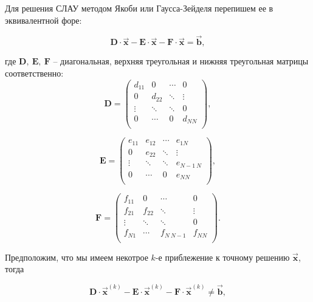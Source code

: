\documentclass[12pt,a4paper]{article}
\begin{document}
		Для решения СЛАУ методом Якоби или Гаусса-Зейделя перепишем ее в эквивалентной форе:

		\begin{equation}
			\mathbf{D} \cdot \vec{\mathbf{x}} - \mathbf{E} \cdot \vec{\mathbf{x}} - \mathbf{F} \cdot \vec{\mathbf{x}} = \vec{\mathbf{b}},
		\end{equation}

		где $\mathbf{D}, \: \mathbf{E}, \: \mathbf{F}$ -- диагональная, верхняя треугольная и нижняя треугольная матрицы соответственно:\\

		\begin{equation}
			\mathbf{D} =
			\begin{pmatrix}
				d_{11}	&0		&\cdots &0		\\
				0		&d_{22}	&\ddots	&\vdots	\\
				\vdots	&\ddots	&\ddots &0		\\
				0		&\cdots	&0		&d_{NN}	\\
			\end{pmatrix},
		\end{equation}

		\begin{equation}
			\mathbf{E} =
			\begin{pmatrix}
				e_{11}	&e_{12}	&\cdots &e_{1N}			\\
				0		&e_{22}	&\ddots	&\vdots			\\
				\vdots	&\ddots	&\ddots &e_{N-1 \: N}	\\
				0		&\cdots	&0		&e_{NN}			\\
			\end{pmatrix},
		\end{equation}

		\begin{equation}
			\mathbf{F} =
			\begin{pmatrix}
				f_{11}	&0		&\cdots			&0		\\
				f_{21}	&f_{22}	&\ddots			&\vdots	\\
				\vdots	&\ddots	&\ddots			&0		\\
				f_{N1}	&\cdots	&f_{N \: N-1}	&f_{NN}	\\
			\end{pmatrix}.
		\end{equation}

		Предположим, что мы имеем некотрое $k$-е приблежение к точному решению $\vec{\mathbf{x}}$, тогда

		\begin{equation}
			\mathbf{D} \cdot \vec{\mathbf{x}}^{(k)} - \mathbf{E} \cdot \vec{\mathbf{x}}^{(k)} - \mathbf{F} \cdot \vec{\mathbf{x}}^{(k)} \neq \vec{\mathbf{b}},
		\end{equation}
\end{document}
